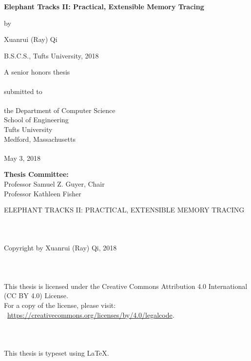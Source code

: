 \documentclass[12pt]{report}
\theoremstyle{definition}
\begin{document}
    
    
\begin{titlepage}
\begin{center}        
\LARGE
\textbf{Elephant Tracks II: Practical, Extensible Memory Tracing}
        
\vspace{0.5in}
\large
by
\vspace{0.5in}

\Large
Xuanrui (Ray) Qi

\vspace{0.25in}

\normalsize
B.S.C.S., Tufts University, 2018

\vspace{1in}

\normalsize
A senior honors thesis\\~\\
submitted to\\~\\
the Department of Computer Science\\
School of Engineering\\
Tufts University\\
Medford, Massachusetts\\~\\
May 3, 2018

\vspace{0.75in}

\normalsize
\textbf{Thesis Committee:}\\
Professor Samuel Z. Guyer, Chair\\
Professor Kathleen Fisher
        
\end{center}
\end{titlepage}

\newpage
\vspace*{\fill}
\noindent
ELEPHANT TRACKS II: PRACTICAL, EXTENSIBLE MEMORY TRACING\\~\\\\~\\
Copyright by Xuanrui (Ray) Qi, 2018\\~\\\\~\\
This thesis is licensed under the Creative Commons Attribution 4.0 International (CC BY 4.0) License.\\
For a copy of the license, please visit: ~\url{https://creativecommons.org/licenses/by/4.0/legalcode}.\\~\\\\~\\
This thesis is typeset using \LaTeX.
\vspace*{\fill}
\thispagestyle{empty}
\end{document}
